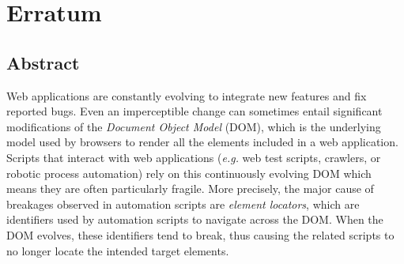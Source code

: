 \chapter{Erratum}
\section{Abstract}

Web applications are constantly evolving to integrate new features and fix reported bugs.
Even an imperceptible change can sometimes entail significant modifications of the \emph{Document Object Model} (DOM), which is the underlying model used by browsers to render all the elements included in a web application.
Scripts that interact with web applications (\emph{e.g.} web test scripts, crawlers, or robotic process automation) rely on this continuously evolving DOM which means they are often particularly fragile.
More precisely, the major cause of breakages observed in automation scripts are \emph{element locators}, which are identifiers used by automation scripts to navigate across the DOM. When the DOM evolves, these identifiers tend to break, thus causing the related scripts to no longer locate the intended target elements.

